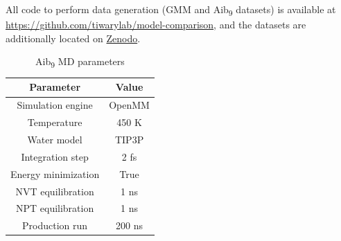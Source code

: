 All code to perform data generation (GMM and Aib\textsubscript{9} datasets) is available at \url{https://github.com/tiwarylab/model-comparison}, and the datasets are additionally located on \href{https://zenodo.org/records/14679134?token=eyJhbGciOiJIUzUxMiJ9.eyJpZCI6IjAyYmYzODhlLWE2ZjYtNDA4NS1iNDhlLTJlNzZmMzcyNzMwZCIsImRhdGEiOnt9LCJyYW5kb20iOiI0YTE3NTE3N2Y4MThkODg0YTY4NTI4OWExMGE3NmNmNiJ9.HcFgvUV0sK8EhJm0Ow8cFn-56q8rGuSWj_LBQIcpzMZ_mAySqnJ4pJeJubxw_3Dtl2chUoHAGOaxgaRFyZRLWg}{Zenodo}.
\begin{table}[htbp]
\centering
\begin{tabular}{|c|c|}
\hline
\textbf{Parameter} & \textbf{Value} \\
\hline
Simulation engine & OpenMM \\
Temperature & 450 K \\
Water model & TIP3P \\
Integration step & 2 fs \\
Energy minimization & True \\
NVT equilibration & 1 ns \\
NPT equilibration & 1 ns \\
Production run & 200 ns \\
\hline
\end{tabular}
\vspace{10pt}
\caption{Aib\textsubscript{9} MD parameters}
\label{ch2:tab:aib9-md}
\end{table}
